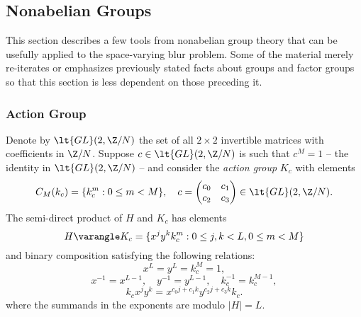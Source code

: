 \subsection{Nonabelian Groups}
\label{sec:group-algebra-methods}
This section describes a few tools from nonabelian group
theory that can be usefully applied to the space-varying
blur problem. Some of the material merely re-iterates or
emphasizes previously stated facts about groups and factor 
groups so that this section is less dependent on
those preceding it. 
\subsubsection{Action Group}

Denote by $\lt{GL}(2,\Z/N)$ the set of all $2\times 2$ invertible
matrices with coefficients in $\Z/N$.  
Suppose $c\in \lt{GL}(2,\Z/N)$ is such that $c^M=1$ -- the identity
in $\lt{GL}(2,\Z/N)$ -- and consider the \emph{action group} $K_c$
with elements
\[
C_M(k_c) = \{k_c^m : 0 \leq m < M\}, \quad
c = \begin{pmatrix} c_0 & c_1 \\ c_2 & c_3 \end{pmatrix}
\in \lt{GL}(2,\Z/N).
\]
The semi-direct product of $H$ and $K_c$ has elements
\[
H\varangle K_c = \{x^j y^k k_c^m : 0 \leq j,k < L, 0 \leq m< M\}
\]
and binary composition satisfying the following relations:
\[
x^L = y^L = k_c^M = 1,
\]
\[
x^{-1} = x^{L-1}, \quad y^{-1}= y^{L-1}, \quad k_c^{-1} = k_c^{M-1},
\]
\[
k_c x^j y^k = x^{c_0 j + c_1 k} y^{c_2 j + c_3 k} k_c.
\]
where the summands in the exponents are modulo $|H|=L$.

